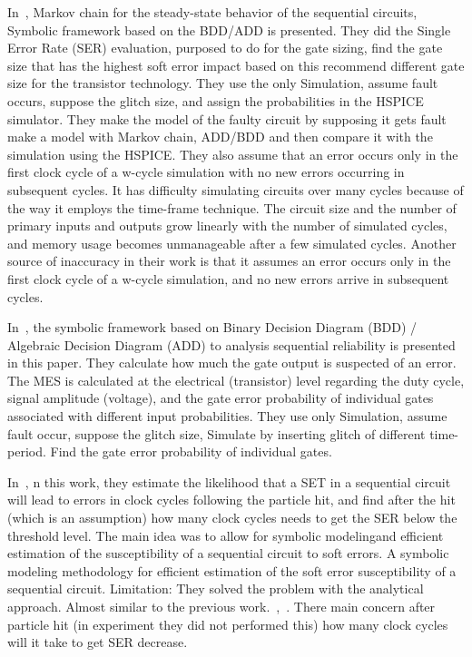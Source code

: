 In~\cite{miskov2008modeling}, Markov chain for the steady-state behavior of the sequential circuits, Symbolic framework
based on the BDD/ADD is presented. They did the Single Error Rate (SER) evaluation, purposed to do
for the gate sizing, find the gate size that has the highest soft error impact based on this recommend
different gate size for the transistor technology. They use the only Simulation, assume fault occurs, suppose the glitch size, and assign the
probabilities in the HSPICE simulator. They make the model of the faulty circuit by supposing it gets
fault make a model with Markov chain, ADD/BDD and then compare it with the simulation using the
HSPICE. They also assume that an error occurs only in the first clock cycle of a w-cycle simulation with
no new errors occurring in subsequent cycles. It has difficulty simulating circuits over many cycles
because of the way it employs the time-frame technique. The circuit size and the number of primary
inputs and outputs grow linearly with the number of simulated cycles, and memory usage becomes
unmanageable after a few simulated cycles. Another source of inaccuracy in their work is that it
assumes an error occurs only in the first clock cycle of a w-cycle simulation, and no new errors arrive in
subsequent cycles.

In~\cite{miskov2007mars}, the symbolic framework based on Binary Decision Diagram (BDD) / Algebraic Decision
Diagram (ADD) to analysis sequential reliability is presented in this paper. They calculate how much the
gate output is suspected of an error. The MES is calculated at the electrical (transistor) level regarding
the duty cycle, signal amplitude (voltage), and the gate error probability of individual gates associated
with different input probabilities. They use only Simulation, assume fault occur, suppose the glitch size, Simulate by inserting
glitch of different time-period. Find the gate error probability of individual gates. 


In~\cite{miskov2007mars}, n this work, they estimate the likelihood that a SET in a sequential circuit will lead to errors
in clock cycles following the particle hit, and find after the hit (which is an assumption) how many clock
cycles needs to get the SER below the threshold level. The main idea was to allow for symbolic modelingand efficient estimation of the susceptibility of a sequential circuit to soft errors. A symbolic modeling
methodology for efficient estimation of the soft error susceptibility of a sequential circuit.
Limitation: They solved the problem with the analytical approach. Almost similar to the previous work.~\cite{miskov2007mars},~\cite{miskov2008modeling}. There main concern after particle hit (in experiment they did not performed this) how many
clock cycles will it take to get SER decrease.


